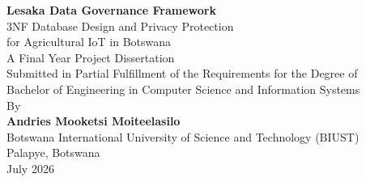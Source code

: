 
\begin{titlepage}
    \centering
    \vspace*{2cm}
    
    {\Huge \textbf{Lesaka Data Governance Framework}}\\[1cm]
    
    {\Large 3NF Database Design and Privacy Protection}\\[0.5cm]
    
    {\Large for Agricultural IoT in Botswana}\\[2cm]
    
    {\large A Final Year Project Dissertation}\\[1cm]
    
    {\large Submitted in Partial Fulfillment of the Requirements for the Degree of}\\[0.5cm]
    
    {\large Bachelor of Engineering in Computer Science and Information Systems}\\[2cm]
    
    {\large By}\\[0.5cm]
    
    {\large \textbf{Andries Mooketsi Moiteelasilo}}\\[1cm]
    
    {\large Botswana International University of Science and Technology (BIUST)}\\[0.5cm]
    
    {\large Palapye, Botswana}\\[2cm]
    
    {\large July 2026}
    
    \vspace*{2cm}
\end{titlepage}
